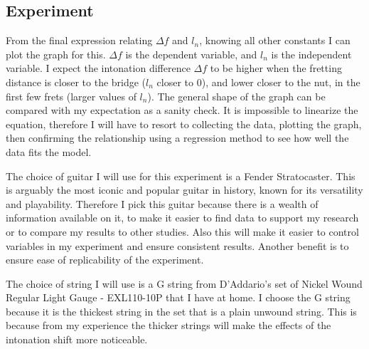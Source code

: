 \documentclass[11pt]{article}
\begin{document}
\begin{flushleft}
    \section{Experiment}
        From the final expression relating $\Delta f$ and $l_n$, knowing all other constants I can plot the graph for this. $\Delta f$ is the dependent variable, and $l_n$ is the independent variable. I expect the intonation difference $\Delta f$ to be higher when the fretting distance is closer to the bridge ($l_n$ closer to 0), and lower closer to the nut, in the first few frets (larger values of $l_n$). The general shape of the graph can be compared with my expectation as a sanity check. It is impossible to linearize the equation, therefore I will have to resort to collecting the data, plotting the graph, then confirming the relationship using a regression method to see how well the data fits the model. \par
        The choice of guitar I will use for this experiment is a Fender Stratocaster. This is arguably the most iconic and popular guitar in history, known for its versatility and playability. Therefore I pick this guitar because there is a wealth of information available on it, to make it easier to find data to support my research or to compare my results to other studies. Also this will make it easier to control variables in my experiment and ensure consistent results. Another benefit is to ensure ease of replicability of the experiment. \par
        The choice of string I will use is a G string from D'Addario's set of Nickel Wound Regular Light Gauge - EXL110-10P that I have at home. I choose the G string because it is the thickest string in the set that is a plain unwound string. This is because from my experience the thicker strings will make the effects of the intonation shift more noticeable. %

\end{flushleft}
\end{document}
